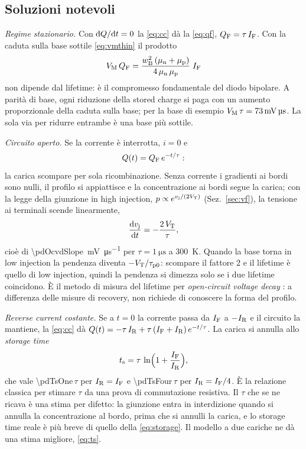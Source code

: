 \documentclass[10pt,a4paper]{scrartcl}
\let\newcommand\pdvaluedefine
\newcommand{\IF}{I_\mathrm{F}}
\newcommand{\IR}{I_\mathrm{R}}
\newcommand{\ts}{t_\mathrm{s}}
\newcommand{\vj}{v_\mathrm{j}}
\newcommand{\VT}{V_\mathrm{T}}
\newcommand{\diff}{\mathrm{d}}
\newcommand{\wB}{w_\mathrm{B}}
\newcommand{\mun}{\mu_\mathrm{n}}
\newcommand{\mup}{\mu_\mathrm{p}}
\newcommand{\VM}{V_\mathrm{M}}
\newcommand{\QF}{Q_\mathrm{F}}
\begin{document}
\subsection{Soluzioni notevoli}
\label{sec:ccsolutions}
\emph{Regime stazionario.} Con $\diff Q/\diff t = 0$ la \eqref{eq:cc} dà la \eqref{eq:qf}, $\QF = \tau\,\IF$. Con la caduta sulla base sottile \eqref{eq:vmthin} il prodotto
\begin{equation}
\VM\,\QF = \frac{\wB^2\,(\mun+\mup)}{4\,\mun\,\mup}\;\IF
\label{eq:tradeoff}
\end{equation}
non dipende dal lifetime: è il compromesso fondamentale del diodo bipolare. A parità di base, ogni riduzione della stored charge si paga con un aumento proporzionale della caduta sulla base; per la base di esempio $\VM\,\tau = \SI{\pdExVmTau}{\milli\volt\micro\second}$. La sola via per ridurre entrambe è una base più sottile.

\emph{Circuito aperto.} Se la corrente è interrotta, $i = 0$ e
\begin{equation}
Q(t) = \QF\,e^{-t/\tau} :
\label{eq:opencircuit}
\end{equation}
la carica scompare per sola ricombinazione. Senza corrente i gradienti ai bordi sono nulli, il profilo si appiattisce e la concentrazione ai bordi segue la carica; con la legge della giunzione in high injection, $p \propto e^{\vj/(2\VT)}$ (Sez.~\ref{sec:vf}), la tensione ai terminali scende linearmente,
\begin{equation}
\frac{\diff\vj}{\diff t} = -\frac{2\,\VT}{\tau} ,
\label{eq:ocvd}
\end{equation}
cioè di \SI{\pdOcvdSlope}{\milli\volt\per\micro\second} per $\tau = \SI{1}{\micro\second}$ a \SI{300}{\kelvin}. Quando la base torna in low injection la pendenza diventa $-\VT/\tau_\mathrm{p0}$: scompare il fattore 2 e il lifetime è quello di low injection, quindi la pendenza si dimezza solo se i due lifetime coincidono. È il metodo di misura del lifetime per \emph{open-circuit voltage decay} \cite{schroder}: a differenza delle misure di recovery, non richiede di conoscere la forma del profilo.

\emph{Reverse current costante.} Se a $t = 0$ la corrente passa da $\IF$ a $-\IR$ e il circuito la mantiene, la \eqref{eq:cc} dà $Q(t) = -\tau\,\IR + \tau\,(\IF + \IR)\,e^{-t/\tau}$. La carica si annulla allo \emph{storage time}
\begin{equation}
\ts = \tau\,\ln\Bigl(1 + \frac{\IF}{\IR}\Bigr) ,
\label{eq:storage}
\end{equation}
che vale \num{\pdTsOne}\,$\tau$ per $\IR = \IF$ e \num{\pdTsFour}\,$\tau$ per $\IR = \IF/4$. È la relazione classica per stimare $\tau$ da una prova di commutazione resistiva. Il $\tau$ che se ne ricava è una stima per difetto: la giunzione entra in interdizione quando si annulla la concentrazione al bordo, prima che si annulli la carica, e lo storage time reale è più breve di quello della \eqref{eq:storage}. Il modello a due cariche ne dà una stima migliore, \eqref{eq:ts}.
\end{document}
